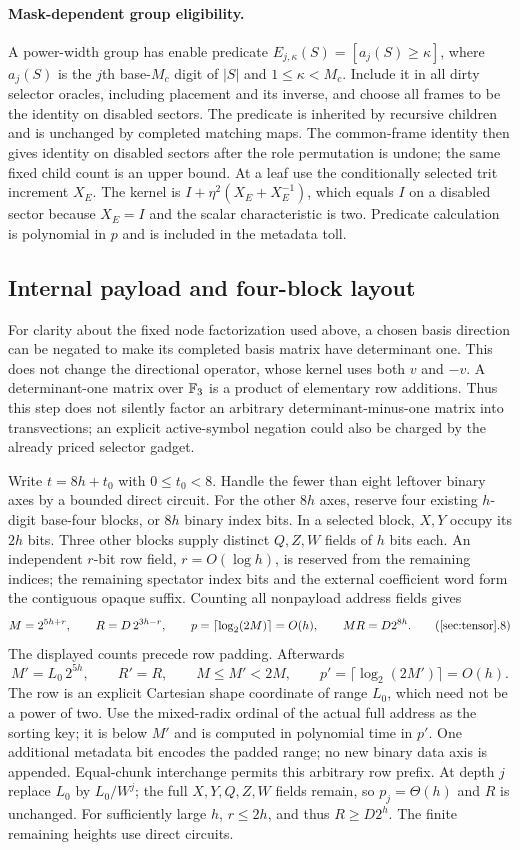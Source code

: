 \paragraph{Mask-dependent group eligibility.}
A power-width group has enable predicate
$E_{j,\kappa}(S)=[a_j(S)\ge\kappa]$, where $a_j(S)$ is the
$j$th base-$M_c$ digit of $|S|$ and $1\le\kappa<M_c$.
Include it in all dirty selector oracles, including placement and its
inverse, and choose all frames to be the identity
on disabled sectors. The predicate is inherited by recursive children
and is unchanged by completed matching maps. The common-frame identity
then gives identity on disabled sectors after the role permutation is
undone; the same fixed child count is an upper bound. At a leaf use
the conditionally selected trit increment $X_E$. The kernel is
$I+\eta^2(X_E+X_E^{-1})$, which equals $I$ on a disabled sector
because $X_E=I$ and the scalar characteristic is two. Predicate
calculation is polynomial in $p$ and is included in the metadata toll.

\subsection{Internal payload and four-block layout}

For clarity about the fixed node factorization used above, a chosen
basis direction can be negated to make its completed basis matrix
have determinant one. This does not change the directional operator,
whose kernel uses both $v$ and $-v$. A determinant-one matrix over
$\mathbb F_3$ is a product of elementary row additions. Thus this step does
not silently factor an arbitrary determinant-minus-one matrix into
transvections; an explicit active-symbol negation could also be
charged by the already priced selector gadget.

Write $t=8h+t_0$ with $0\le t_0<8$. Handle the fewer than eight leftover binary axes by a bounded direct circuit. For the other $8h$ axes, reserve four existing $h$-digit base-four blocks, or $8h$ binary index bits. In a selected block, $X,Y$ occupy its $2h$ bits. Three other blocks supply distinct $Q,Z,W$ fields of $h$ bits each. An independent $r$-bit row field, $r=O(\log h)$, is reserved from the remaining indices; the remaining spectator index bits and the external coefficient word form the contiguous opaque suffix. Counting all nonpayload address fields gives
\[
 M=2^{5h+r},\qquad R=D\,2^{3h-r},\qquad p=\lceil\log_2(2M)\rceil=O(h),
 \qquad MR=D2^{8h}.
 \tag{\ref{sec:tensor}.8}
\]
The displayed counts precede row padding. Afterwards
\[
 M'=L_0\,2^{5h},\qquad R'=R,\qquad M\le M'<2M,\qquad
 p'=\lceil\log_2(2M')\rceil=O(h).
\]
The row is an explicit Cartesian shape coordinate of range $L_0$, which need not be a power of two. Use the mixed-radix ordinal of the actual full address as the sorting key; it is below $M'$ and is computed in polynomial time in $p'$. One additional metadata bit encodes the padded range; no new binary data axis is appended. Equal-chunk interchange permits this arbitrary row prefix. At depth $j$ replace $L_0$ by $L_0/W^j$; the full $X,Y,Q,Z,W$ fields remain, so $p_j=\Theta(h)$ and $R$ is unchanged. For sufficiently large $h$, $r\le2h$, and thus $R\ge D2^h$. The finite remaining heights use direct circuits.


